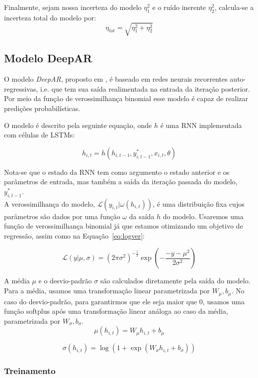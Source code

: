 Finalmente, sejam nossa incerteza do modelo $\eta_1^2$ e o ruído inerente
$\eta^2_2$, calcula-se a incerteza total do modelo por: \\

\[  \eta_{tot} = \sqrt{  \eta_1^2 + \eta_2^2 }  \]


\subsection{Modelo DeepAR}

O modelo \textit{DeepAR}, proposto em \cite{deepar}, é baseado em redes neurais recorrentes auto-regressivas,
i.e. que tem sua saída realimentada na entrada da iteração posterior. Por meio da função de verossimilhança binomial esse modelo é capaz
de realizar predições probabilísticas.

O modelo é descrito pela seguinte equação, onde $h$ é uma RNN implementada com células de LSTMs:

\[
h_{i,t} = h(h_{i,t-1},y^*_{i,t-1},x_{i,t}, \theta)
\]

Nota-se que o estado da RNN tem como argumento o estado anterior e os parâmetros de entrada, mas também a saída da iteração passada do modelo, $y^*_{i,t-1}$. \\

A verossimilhança do modelo, $\mathcal{L}(y_{i,t} | \omega(h_{i,t}))$, é uma distribuição fixa cujos parâmetros são dados por uma função $\omega$ da saída $h$ do modelo. Usaremos uma função de verossimilhança binomial já que estamos otimizando um objetivo de regressão, assim como na Equação~\ref{eq:logver}:

\[
\mathcal{L}(y | \mu,\sigma) = {(2\pi\sigma^2)}^{-\frac{1}{2}} \exp(-  \frac{-y - \mu^2}{2\sigma^2})  
\]

A média $\mu$ e o desvio-padrão $\sigma$ são calculados diretamente pela saída do modelo. Para a média, usamos uma transformação linear parametrizada por $W_{\mu},b_{\mu}$. No caso do desvio-padrão, para garantirmos que ele seja maior que 0, usamos uma função softplus após uma transformação linear análoga ao caso da média, parametrizada por  $W_{\sigma},b_{\sigma}$.\\

\[ \mu(h_{i,t}) = W_{\mu}h_{i,t} + b_{\mu} \]

\[ \sigma(h_{i,t}) = \log(1 + \exp(W_{\sigma}h_{i,t}+ b_{\sigma})) \]


\subsubsection{Treinamento}


